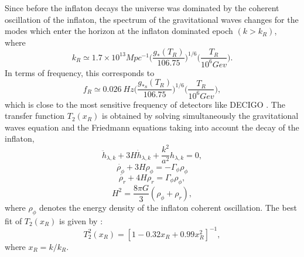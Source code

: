 \documentclass[11pt,a4paper,twoside]{book}
\begin{document}
Since before the inflaton decays the universe was dominated by the coherent oscillation of the inflaton, the spectrum of the gravitational waves changes for the modes which enter the horizon at the inflaton dominated epoch $ (k>k_{R}) $, where
\begin{equation}
	\label{Chap3:kReheating}
	k_{R}\simeq 1.7 \times 10^{13} Mpc^{-1} \Bigg(\frac{g_{*}(T_{R})}{106.75}\Bigg)^{1/6}\Bigg(\frac{T_{R}}{10^{6}Gev}\Bigg).
\end{equation}
In terms of frequency, this corresponds to 
\begin{equation}
	\label{Chap3:frequencyReheating}
	f_{R} \simeq 0.026\ Hz \Bigg (\frac{g_{*s}(T_{R})}{106.75}\Bigg)^{1/6}\Bigg ( \frac{T_{R}}{10^{6} Gev} \Bigg),
\end{equation}
which is close to the most sensitive frequency of detectors like DECIGO \cite{Chap3:ProibingReheatingTemperature2008}. The transfer function $ T_{2}(x_{R}) $ is obtained  by solving simultaneously the gravitational waves equation and the Friedmann equations taking into account the decay of the inflaton,
\begin{equation}
\ddot{h}_{\lambda,k} + 3H\dot{h}_{\lambda,k} + \frac{k^{2}}{a^{2}}h_{\lambda,k} = 0,
\end{equation}
\begin{equation}
	\dot{\rho_{\phi}} + 3H\rho_{\phi} = -\Gamma_{\phi}\rho_{\phi}
\end{equation}
\begin{equation}
	\dot{\rho_{r}} + 4H\rho_{r} = \Gamma_{\phi}\rho_{\phi},	
\end{equation}
\begin{equation}
	H^{2}=\dfrac{8\pi G}{3}(\rho_{\phi} + \rho_{r}),
\end{equation}
where $\rho_{\phi}$ denotes the energy density of the inflaton coherent oscillation. The best fit of $ T_{2}(x_{R}) $ is given by \cite{Chap3:ProibingReheatingTemperature2008}:
\begin{equation}
	\label{Chap3:TransferFunction2}
	 T_{2}^{2}(x_{R}) = [1-0.32 x_{R} + 0.99 x^{2}_{R}]^{-1},
\end{equation}
where $ x_{R} = k/k_{R} $.\\
\end{document}
